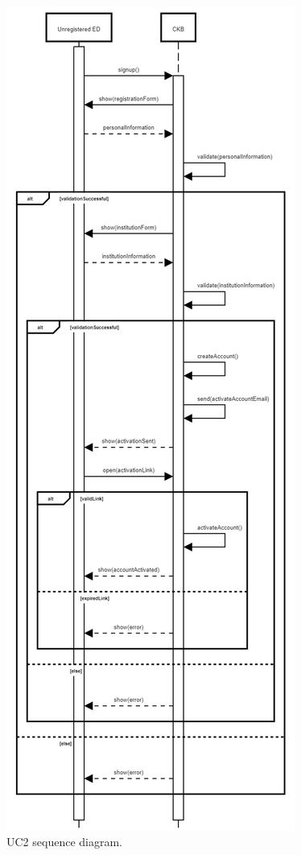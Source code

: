 \begin{center}
  \begin{figure} [H]
    \begin{center}
        \includegraphics[width=\textwidth,height=\textheight,keepaspectratio]{Images/SequenceDiagrams/UC2.png}
        \caption{UC2 sequence diagram.}
        \label{fig: UC2_sequence_diagram}
    \end{center}
  \end{figure}
\end{center}


